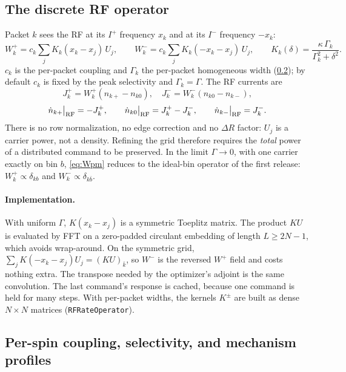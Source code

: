 \documentclass[11pt]{article}
\newcommand{\Iplus}{I^{+}}
\newcommand{\Iminus}{I^{-}}
\newcommand{\kb}{\bar{k}}
\newcommand{\code}[1]{\texttt{#1}}
\begin{document}
\subsection{The discrete RF operator}
\label{sec:rf-operator}

Packet \(k\) sees the RF at its \(\Iplus\) frequency \(x_k\) and at its \(\Iminus\) frequency \(-x_k\):
\begin{equation}
W^+_k = c_k\sum_j K_k(x_k-x_j)\,U_j,\qquad W^-_k = c_k\sum_j K_k(-x_k-x_j)\,U_j,\qquad
K_k(\delta)=\frac{\kappa\,\Gamma_k}{\Gamma_k^2+\delta^2}.
\label{eq:Wpm}
\end{equation}
\(c_k\) is the per-packet coupling and \(\Gamma_k\) the per-packet homogeneous width
(\cref{sec:profiles}); by default \(c_k\) is fixed by the peak selectivity and
\(\Gamma_k=\Gamma\). The RF currents are
\begin{equation}
J^+_k=W^+_k(n_{k+}-n_{k0}),\quad J^-_k=W^-_k(n_{k0}-n_{k-}),
\label{eq:rfcurrents}
\end{equation}
\begin{equation}
\dot n_{k+}\big|_{\rm RF}=-J^+_k,\qquad
\dot n_{k0}\big|_{\rm RF}=J^+_k-J^-_k,\qquad
\dot n_{k-}\big|_{\rm RF}=J^-_k .
\label{eq:rfpops}
\end{equation}
There is no row normalization, no edge correction and no \(\Delta R\) factor: \(U_j\) is a
carrier power, not a density. Refining the grid therefore requires the \emph{total} power of a
distributed command to be preserved. In the limit \(\Gamma\to0\), with one carrier exactly on bin
\(b\), \cref{eq:Wpm} reduces to the ideal-bin operator of the first release:
\(W^+_k\propto\delta_{kb}\) and \(W^-_k\propto\delta_{k\bar b}\).

\paragraph{Implementation.} With uniform \(\Gamma\), \(K(x_k-x_j)\) is a symmetric Toeplitz matrix.
The product \(KU\) is evaluated by FFT on a zero-padded circulant embedding of length
\(L\ge2N-1\), which avoids wrap-around. On the symmetric grid,
\(\sum_jK(-x_k-x_j)U_j=(KU)_{\kb}\), so \(W^-\) is the reversed \(W^+\) field and costs nothing
extra. The transpose needed by the optimizer's adjoint is the same convolution. The last command's
response is cached, because one command is held for many steps. With per-packet widths, the
kernels \(K^\pm\) are built as dense \(N\times N\) matrices (\code{RFRateOperator}).

\subsection{Per-spin coupling, selectivity, and mechanism profiles}
\label{sec:profiles}
\end{document}
